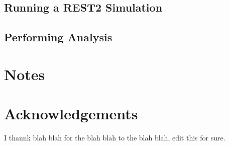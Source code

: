 \documentclass{memoir}
\begin{document}
\subsection{Running a REST2 Simulation}

\subsection{Performing Analysis}


\section{Notes}






\section{Acknowledgements}
I thannk blah blah for the blah blah to the blah blah, edit this for sure.


\end{document}
